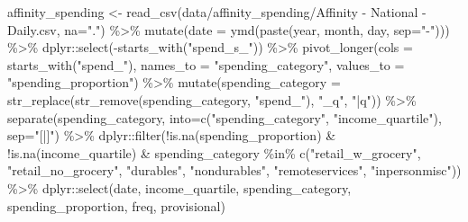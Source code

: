 \documentclass[
]{krantz}
\makeatletter
\newenvironment{Shaded}{\begin{snugshade}}{\end{snugshade}}
\newcommand{\AttributeTok}[1]{\textcolor[rgb]{0.61,0.61,0.61}{#1}}
\newcommand{\FunctionTok}[1]{\textcolor[rgb]{0,0,0}{#1}}
\newcommand{\NormalTok}[1]{#1}
\newcommand{\OtherTok}[1]{\textcolor[rgb]{0.37,0.37,0.37}{#1}}
\newcommand{\SpecialCharTok}[1]{\textcolor[rgb]{0,0,0}{#1}}
\newcommand{\StringTok}[1]{\textcolor[rgb]{0.5,0.5,0.5}{#1}}
\newenvironment{kframe}{%
\medskip{}
\setlength{\fboxsep}{.8em}
 \def\at@end@of@kframe{}%
 \ifinner\ifhmode%
  \def\at@end@of@kframe{\end{minipage}}%
  \begin{minipage}{\columnwidth}%
 \fi\fi%
 \def\FrameCommand##1{\hskip\@totalleftmargin \hskip-\fboxsep
 \colorbox{shadecolor}{##1}\hskip-\fboxsep
     \hskip-\linewidth \hskip-\@totalleftmargin \hskip\columnwidth}%
 \MakeFramed {\advance\hsize-\width
   \@totalleftmargin\z@ \linewidth\hsize
   \@setminipage}}%
 {\par\unskip\endMakeFramed%
 \at@end@of@kframe}
\renewenvironment{Shaded}{\begin{kframe}}{\end{kframe}}
\makeatother
\begin{document}
\begin{Shaded}
\begin{Highlighting}[]
\NormalTok{affinity\_spending }\OtherTok{\textless{}{-}} \FunctionTok{read\_csv}\NormalTok{(}\StringTok{\textquotesingle{}data/affinity\_spending/Affinity {-} National {-} Daily.csv\textquotesingle{}}\NormalTok{, }\AttributeTok{na=}\StringTok{"."}\NormalTok{) }\SpecialCharTok{\%\textgreater{}\%}
  \FunctionTok{mutate}\NormalTok{(}\AttributeTok{date =} \FunctionTok{ymd}\NormalTok{(}\FunctionTok{paste}\NormalTok{(year, month, day, }\AttributeTok{sep=}\StringTok{"{-}"}\NormalTok{))) }\SpecialCharTok{\%\textgreater{}\%}
\NormalTok{  dplyr}\SpecialCharTok{::}\FunctionTok{select}\NormalTok{(}\SpecialCharTok{{-}}\FunctionTok{starts\_with}\NormalTok{(}\StringTok{"spend\_s\_"}\NormalTok{)) }\SpecialCharTok{\%\textgreater{}\%}
  \FunctionTok{pivot\_longer}\NormalTok{(}\AttributeTok{cols =}  \FunctionTok{starts\_with}\NormalTok{(}\StringTok{"spend\_"}\NormalTok{), }\AttributeTok{names\_to =} \StringTok{"spending\_category"}\NormalTok{, }\AttributeTok{values\_to =} \StringTok{"spending\_proportion"}\NormalTok{) }\SpecialCharTok{\%\textgreater{}\%}
  \FunctionTok{mutate}\NormalTok{(}\AttributeTok{spending\_category =} \FunctionTok{str\_replace}\NormalTok{(}\FunctionTok{str\_remove}\NormalTok{(spending\_category, }\StringTok{"spend\_"}\NormalTok{), }\StringTok{"\_q"}\NormalTok{, }\StringTok{"|q"}\NormalTok{)) }\SpecialCharTok{\%\textgreater{}\%}
  \FunctionTok{separate}\NormalTok{(spending\_category, }\AttributeTok{into=}\FunctionTok{c}\NormalTok{(}\StringTok{"spending\_category"}\NormalTok{, }\StringTok{"income\_quartile"}\NormalTok{), }\AttributeTok{sep=}\StringTok{"[|]"}\NormalTok{) }\SpecialCharTok{\%\textgreater{}\%}
\NormalTok{  dplyr}\SpecialCharTok{::}\FunctionTok{filter}\NormalTok{(}\SpecialCharTok{!}\FunctionTok{is.na}\NormalTok{(spending\_proportion) }\SpecialCharTok{\&} 
                  \SpecialCharTok{!}\FunctionTok{is.na}\NormalTok{(income\_quartile) }\SpecialCharTok{\&} 
\NormalTok{                  spending\_category }\SpecialCharTok{\%in\%} \FunctionTok{c}\NormalTok{(}\StringTok{"retail\_w\_grocery"}\NormalTok{, }\StringTok{"retail\_no\_grocery"}\NormalTok{, }
                                           \StringTok{"durables"}\NormalTok{, }\StringTok{"nondurables"}\NormalTok{, }
                                           \StringTok{"remoteservices"}\NormalTok{, }\StringTok{"inpersonmisc"}\NormalTok{)) }\SpecialCharTok{\%\textgreater{}\%}
\NormalTok{  dplyr}\SpecialCharTok{::}\FunctionTok{select}\NormalTok{(date, income\_quartile, spending\_category, }
\NormalTok{                spending\_proportion, freq, provisional)}
\end{Highlighting}
\end{Shaded}
\end{document}
